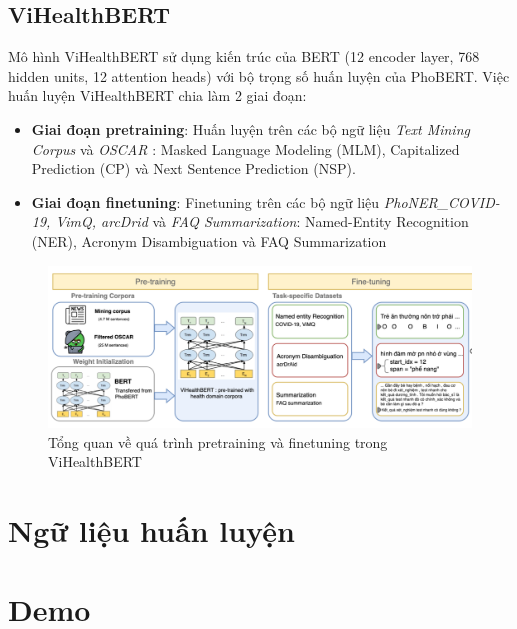 \documentclass[12pt]{article}
\begin{document}
\subsection{ViHealthBERT}
Mô hình ViHealthBERT sử dụng kiến trúc của BERT (12 encoder layer, 768 hidden units, 12 attention heads) với bộ trọng số huấn luyện của PhoBERT. Việc huấn luyện ViHealthBERT chia làm 2 giai đoạn:
\begin{itemize}
\item \textbf{Giai đoạn pretraining}: Huấn luyện trên các bộ ngữ liệu \textit{Text Mining Corpus} và \textit{OSCAR} : Masked Language Modeling (MLM), Capitalized Prediction (CP) và Next Sentence Prediction (NSP).
\item \textbf{Giai đoạn finetuning}: Finetuning trên các bộ ngữ liệu \textit{PhoNER\_COVID-19, VimQ, arcDrid} và \textit{FAQ Summarization}: Named-Entity Recognition (NER), Acronym Disambiguation và FAQ Summarization
\end{itemize}
\begin{figure}
\begin{center}
\includegraphics[scale=.8]{img/ViHealthBERT.png}
\caption{Tổng quan về quá trình pretraining và finetuning trong ViHealthBERT\cite{minh-EtAl:2022:LREC}}
\end{center}
\end{figure}

\section{Ngữ liệu huấn luyện}

\section{Demo}

{}
{}


\end{document}
